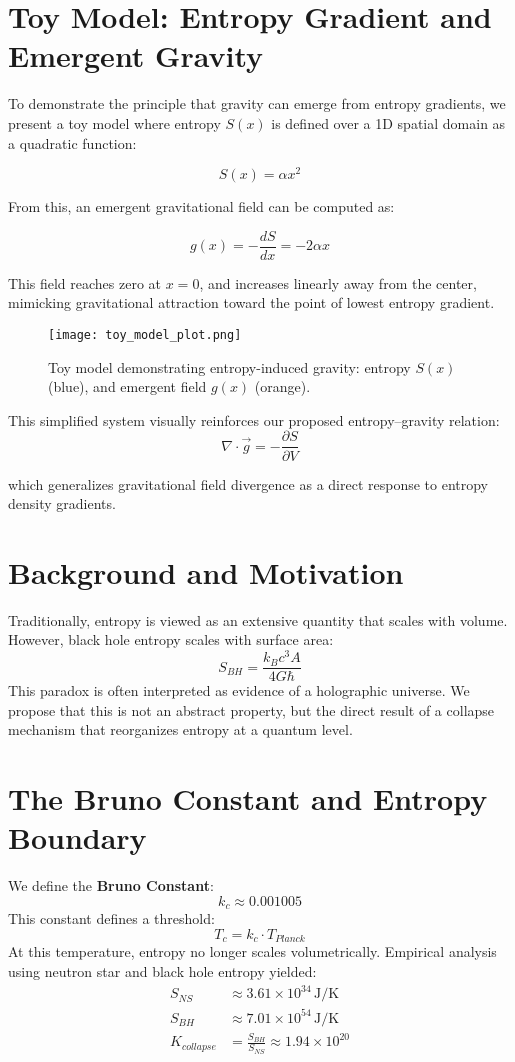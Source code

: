 \documentclass[12pt]{article}
\begin{document}
\tableofcontents
\section{Toy Model: Entropy Gradient and Emergent Gravity}

To demonstrate the principle that gravity can emerge from entropy gradients, we present a toy model where entropy \( S(x) \) is defined over a 1D spatial domain as a quadratic function:

\[
S(x) = \alpha x^2
\]

From this, an emergent gravitational field can be computed as:

\[
g(x) = -\frac{dS}{dx} = -2\alpha x
\]

This field reaches zero at \( x = 0 \), and increases linearly away from the center, mimicking gravitational attraction toward the point of lowest entropy gradient.

\begin{figure}[h]
    \centering
    \texttt{[image: toy\_model\_plot.png]}
    \caption{Toy model demonstrating entropy-induced gravity: entropy \( S(x) \) (blue), and emergent field \( g(x) \) (orange).}
\end{figure}

This simplified system visually reinforces our proposed entropy–gravity relation:
\[
\nabla \cdot \vec{g} = -\frac{\partial S}{\partial V}
\]

which generalizes gravitational field divergence as a direct response to entropy density gradients.
\section{Background and Motivation}
Traditionally, entropy is viewed as an extensive quantity that scales with volume. However, black hole entropy scales with surface area:
\begin{equation}
S_{BH} = \frac{k_B c^3 A}{4 G \hbar}
\end{equation}
This paradox is often interpreted as evidence of a holographic universe. We propose that this is not an abstract property, but the direct result of a collapse mechanism that reorganizes entropy at a quantum level.
\section{The Bruno Constant and Entropy Boundary}
We define the \textbf{Bruno Constant}:
\begin{equation}
\boxed{k_c \approx 0.001005}
\end{equation}
This constant defines a threshold:
\begin{equation}
T_c = k_c \cdot T_{Planck}
\end{equation}
At this temperature, entropy no longer scales volumetrically. Empirical analysis using neutron star and black hole entropy yielded:
\begin{align}
S_{NS} &\approx 3.61 \times 10^{34} \, \text{J/K} \\
S_{BH} &\approx 7.01 \times 10^{54} \, \text{J/K} \\
K_{collapse} &= \frac{S_{BH}}{S_{NS}} \approx 1.94 \times 10^{20}
\end{align}
\end{document}
